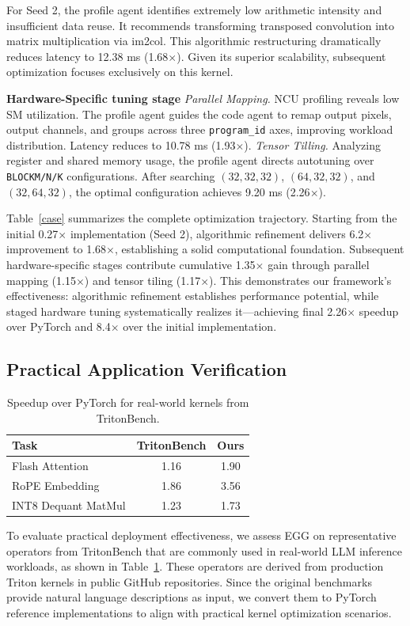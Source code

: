 \documentclass{article}
\theoremstyle{plain}
\theoremstyle{definition}
\theoremstyle{remark}
\begin{document}
For Seed 2, the profile agent identifies extremely low arithmetic intensity and insufficient data reuse. It recommends transforming transposed convolution into matrix multiplication via im2col. This algorithmic restructuring dramatically reduces latency to 12.38 ms (1.68$\times$). Given its superior scalability, subsequent optimization focuses exclusively on this kernel.

\textbf{Hardware-Specific tuning stage}
\emph{Parallel Mapping.} NCU profiling reveals low SM utilization. The profile agent guides the code agent to remap output pixels, output channels, and groups across three \texttt{program\_id} axes, improving workload distribution. Latency reduces to 10.78 ms (1.93$\times$).
\emph{Tensor Tilling.}
Analyzing register and shared memory usage, the profile agent directs autotuning over \texttt{BLOCKM/N/K} configurations. After searching $(32,32,32)$, $(64,32,32)$, and $(32,64,32)$, the optimal configuration achieves 9.20 ms (2.26$\times$).

Table~\ref{case} summarizes the complete optimization trajectory. Starting from the initial 0.27$\times$ implementation (Seed 2), algorithmic refinement delivers 6.2$\times$ improvement to 1.68$\times$, establishing a solid computational foundation. Subsequent hardware-specific stages contribute cumulative 1.35$\times$ gain through parallel mapping (1.15$\times$) and tensor tiling (1.17$\times$). This demonstrates our framework's effectiveness: algorithmic refinement establishes performance potential, while staged hardware tuning systematically realizes it—achieving final 2.26$\times$ speedup over PyTorch and 8.4$\times$ over the initial implementation.



\subsection{Practical Application Verification}
\begin{table}
\centering
\caption{Speedup over PyTorch for real-world kernels from TritonBench.}
\label{tab:real_world_speedup}
\begin{tabular}{lcc}
\toprule
\textbf{Task} & \textbf{TritonBench} & \textbf{Ours} \\
\midrule
Flash Attention        & 1.16 & 1.90 \\
RoPE Embedding         & 1.86 & 3.56 \\
INT8 Dequant MatMul    & 1.23 & 1.73 \\
\bottomrule
\end{tabular}
\end{table}
To evaluate practical deployment effectiveness, we assess EGG on representative operators from TritonBench\cite{li2025tritonbench} that are commonly used in real-world LLM inference workloads, as shown in Table~\ref{tab:real_world_speedup}. These operators are derived from production Triton kernels in public GitHub repositories. Since the original benchmarks provide natural language descriptions as input, we convert them to PyTorch reference implementations to align with practical kernel optimization scenarios.
\end{document}
